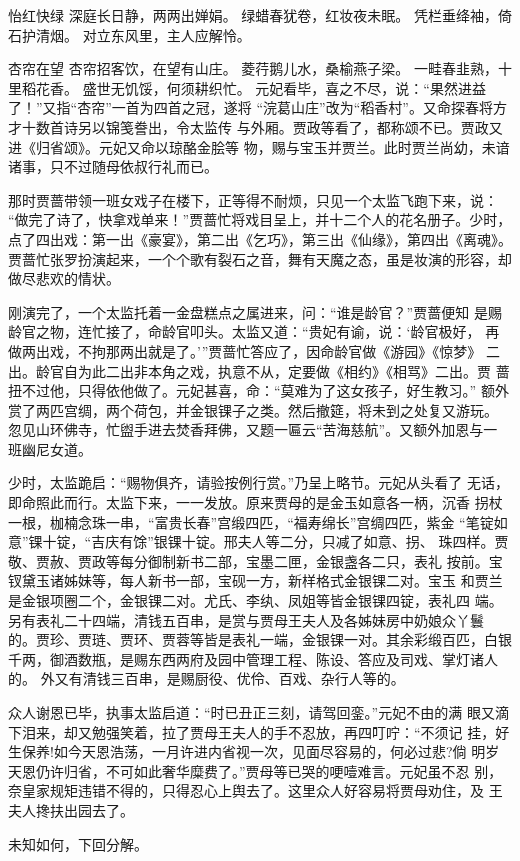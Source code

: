 怡红快绿
深庭长日静，两两出婵娟。
绿蜡春犹卷，红妆夜未眠。
凭栏垂绛袖，倚石护清烟。
对立东风里，主人应解怜。

杏帘在望
杏帘招客饮，在望有山庄。
菱荇鹅儿水，桑榆燕子梁。
一畦春韭熟，十里稻花香。
盛世无饥馁，何须耕织忙。
元妃看毕，喜之不尽，说：“果然进益了！”又指“杏帘”一首为四首之冠，遂将
“浣葛山庄”改为“稻香村”。又命探春将方才十数首诗另以锦笺誊出，令太监传
与外厢。贾政等看了，都称颂不已。贾政又进《归省颂》。元妃又命以琼酪金脍等
物，赐与宝玉并贾兰。此时贾兰尚幼，未谙诸事，只不过随母依叔行礼而已。

那时贾蔷带领一班女戏子在楼下，正等得不耐烦，只见一个太监飞跑下来，说：
“做完了诗了，快拿戏单来！”贾蔷忙将戏目呈上，并十二个人的花名册子。少时，
点了四出戏：第一出《豪宴》，第二出《乞巧》，第三出《仙缘》，第四出《离魂》。
贾蔷忙张罗扮演起来，一个个歌有裂石之音，舞有天魔之态，虽是妆演的形容，却
做尽悲欢的情状。

刚演完了，一个太监托着一金盘糕点之属进来，问：“谁是龄官？”贾蔷便知
是赐龄官之物，连忙接了，命龄官叩头。太监又道：“贵妃有谕，说：‘龄官极好，
再做两出戏，不拘那两出就是了。’”贾蔷忙答应了，因命龄官做《游园》《惊梦》
二出。龄官自为此二出非本角之戏，执意不从，定要做《相约》《相骂》二出。贾
蔷扭不过他，只得依他做了。元妃甚喜，命：“莫难为了这女孩子，好生教习。”
额外赏了两匹宫绸，两个荷包，并金银锞子之类。然后撤筵，将未到之处复又游玩。
忽见山环佛寺，忙盥手进去焚香拜佛，又题一匾云“苦海慈航”。又额外加恩与一
班幽尼女道。

少时，太监跪启：“赐物俱齐，请验按例行赏。”乃呈上略节。元妃从头看了
无话，即命照此而行。太监下来，一一发放。原来贾母的是金玉如意各一柄，沉香
拐杖一根，枷楠念珠一串，“富贵长春”宫缎四匹，“福寿绵长”宫绸四匹，紫金
“笔锭如意”锞十锭，“吉庆有馀”银锞十锭。邢夫人等二分，只减了如意、拐、
珠四样。贾敬、贾赦、贾政等每分御制新书二部，宝墨二匣，金银盏各二只，表礼
按前。宝钗黛玉诸姊妹等，每人新书一部，宝砚一方，新样格式金银锞二对。宝玉
和贾兰是金银项圈二个，金银锞二对。尤氏、李纨、凤姐等皆金银锞四锭，表礼四
端。另有表礼二十四端，清钱五百串，是赏与贾母王夫人及各姊妹房中奶娘众丫鬟
的。贾珍、贾琏、贾环、贾蓉等皆是表礼一端，金银锞一对。其余彩缎百匹，白银
千两，御酒数瓶，是赐东西两府及园中管理工程、陈设、答应及司戏、掌灯诸人的。
外又有清钱三百串，是赐厨役、优伶、百戏、杂行人等的。

众人谢恩已毕，执事太监启道：“时已丑正三刻，请驾回銮。”元妃不由的满
眼又滴下泪来，却又勉强笑着，拉了贾母王夫人的手不忍放，再四叮咛：“不须记
挂，好生保养!如今天恩浩荡，一月许进内省视一次，见面尽容易的，何必过悲?倘
明岁天恩仍许归省，不可如此奢华糜费了。”贾母等已哭的哽噎难言。元妃虽不忍
别，奈皇家规矩违错不得的，只得忍心上舆去了。这里众人好容易将贾母劝住，及
王夫人搀扶出园去了。

未知如何，下回分解。